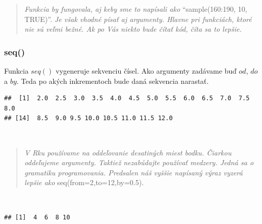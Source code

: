 \begin{quote}
\emph{Funkcia by fungovala, aj keby sme to napísali ako}
``sample(160:190, 10, TRUE)''. \emph{Je však vhodné písať aj argumenty.
Hlavne pri funkciách, ktoré nie sú veľmi bežné. Ak po Vás niekto bude
čítať kód, číta sa to lepšie.}
\end{quote}

\hypertarget{seq}{%
\subsubsection{seq()}\label{seq}}

Funkcia \(seq()\) vygeneruje sekvenciu čísel. Ako argumenty zadávame buď
\(od\), \(do\) a \(by\). Teda po akých inkrementoch bude daná sekvencia
narastať.

\begin{Shaded}
\begin{Highlighting}[]
\NormalTok{(} \NormalTok{, } \NormalTok{, } \NormalTok{)}
\end{Highlighting}
\end{Shaded}

\begin{verbatim}
##  [1]  2.0  2.5  3.0  3.5  4.0  4.5  5.0  5.5  6.0  6.5  7.0  7.5  8.0
## [14]  8.5  9.0 9.5 10.0 10.5 11.0 11.5 12.0
\end{verbatim}

~

\begin{quote}
\emph{V Rku používame na oddeľovanie desatiných miest bodku. Čiarkou
oddeľujeme argumenty. Taktiež nezabúdajte používať medzery. Jedná sa o
gramatiku programovania. Predsalen náš vyššie napísaný výraz vyzerá
lepšie ako} seq(from=2,to=12,by=0.5).
\end{quote}

~

\begin{Shaded}
\begin{Highlighting}[]
\NormalTok{(} \NormalTok{, } \NormalTok{, } \NormalTok{) }
\end{Highlighting}
\end{Shaded}

\begin{verbatim}
## [1]  4  6  8 10
\end{verbatim}

